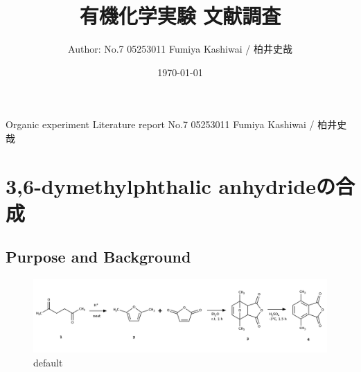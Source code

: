 \documentclass{ltjsarticle}
\title{有機化学実験 文献調査}
\date{\today}
\author{Author: No.7 05253011 Fumiya Kashiwai / 柏井史哉}
\theoremstyle{definition}
\numberwithin{equation}{section}
\begin{document}
\maketitle
{} {Organic experiment Literature report No.7 05253011 Fumiya Kashiwai / 柏井史哉}

\newpage
\section{3,6-dymethylphthalic anhydrideの合成}
\subsection{Purpose and Background}
\begin{figure}[htbp]
\begin{center}
\includegraphics[width = 15 cm]{scheme6-1.png}
\caption{default}
\label{default}
\end{center}
\end{figure}
\end{document}
